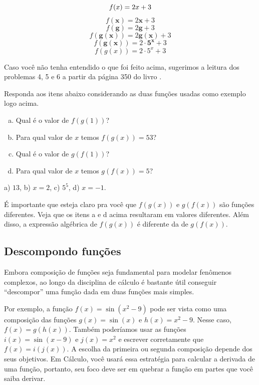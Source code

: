 \documentclass[main.tex]{subfiles}
\begin{document}
$$ f(x)=2x+3 \newline $$
$$ f(\mathbf{x})=2 \mathbf{x}+3  $$
$$ f(\mathbf{g})=2 \mathbf{g}+3  $$
$$ f(\mathbf{g(x)})=2 \mathbf{g(x)}+3  $$
$$ f(\mathbf{g(x)})=2 \cdot \mathbf{5^x}+3  $$
$$f(g(x))=2 \cdot 5^x+3  $$

Caso você não tenha entendido o que foi feito acima, sugerimos a leitura dos problemas 4, 5 e 6 a partir da página 350 do livro .

\begin{questao}
Responda aos itens abaixo considerando as duas funções usadas como exemplo logo acima.
\begin{enumerate}[a)]
\item Qual é o valor de $f(g(1))$?
\item Para qual valor de $x$ temos $f(g(x))=53$?
\item Qual é o valor de $g(f(1))$?
\item Para qual valor de $x$ temos $g(f(x))=5$?
\end{enumerate}
\end{questao}


\begin{gabarito}
	\begin{gabaritoQuestao}
		a) $13$, b) $x=2$, c) $5^5$, d) $x=-1$.
	\end{gabaritoQuestao}
\end{gabarito}

É importante que esteja claro pra você que $f(g(x))$ e $g(f(x))$ são funções diferentes. Veja que os itens a e d acima resultaram em valores diferentes. Além disso, a expressão algébrica de $f(g(x))$ é diferente da de $g(f(x))$.

\subsection*{Descompondo funções}

Embora composição de funções seja fundamental para modelar fenômenos complexos, ao longo da disciplina de cálculo é bastante útil conseguir ``descompor'' uma função dada em duas funções mais simples.

Por exemplo, a função $f(x)=\sin(x^2-9)$ pode ser vista como uma composição das funções $g(x)=\sin(x)$ e $h(x)=x^2-9$. Nesse caso, $f(x)=g(h(x))$. Também poderíamos usar as funções $i(x)=\sin(x-9)$ e $j(x)=x^2$ e escrever corretamente que $f(x)=i(j(x))$. A escolha da primeira ou segunda composição depende dos seus objetivos. Em Cálculo, você usará essa estratégia para calcular a derivada de uma função, portanto, seu foco deve ser em quebrar a função em partes que você saiba derivar.
\end{document}

